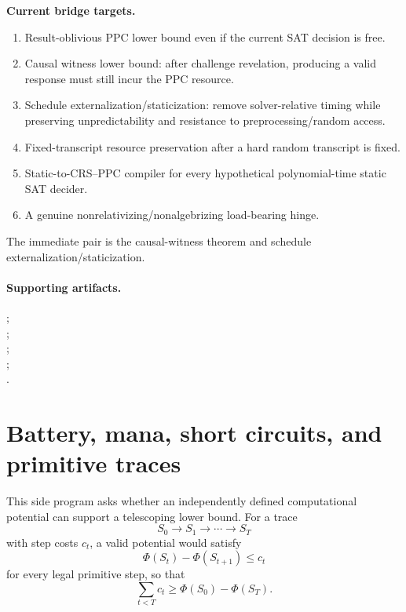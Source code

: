 \documentclass[11pt]{article}
\begin{document}
\begin{candidatebox}
\textbf{Current bridge targets.}
\begin{enumerate}
  \item Result-oblivious PPC lower bound even if the current SAT decision is free.
  \item Causal witness lower bound: after challenge revelation, producing a valid response must
        still incur the PPC resource.
  \item Schedule externalization/staticization: remove solver-relative timing while preserving
        unpredictability and resistance to preprocessing/random access.
  \item Fixed-transcript resource preservation after a hard random transcript is fixed.
  \item Static-to-CRS--PPC compiler for every hypothetical polynomial-time static SAT decider.
  \item A genuine nonrelativizing/nonalgebrizing load-bearing hinge.
\end{enumerate}
The immediate pair is the causal-witness theorem and schedule externalization/staticization.
\end{candidatebox}

\paragraph{Supporting artifacts.}
;\\
;\\
;\\
;\\
.
\section{Battery, mana, short circuits, and primitive traces}

This side program asks whether an independently defined computational potential can support a
telescoping lower bound. For a trace
\[
S_0\to S_1\to\cdots\to S_T
\]
with step costs \(c_t\), a valid potential would satisfy
\[
\Phi(S_t)-\Phi(S_{t+1})\le c_t
\]
for every legal primitive step, so that
\[
\sum_{t<T} c_t
\ge
\Phi(S_0)-\Phi(S_T).
\]
\end{document}
